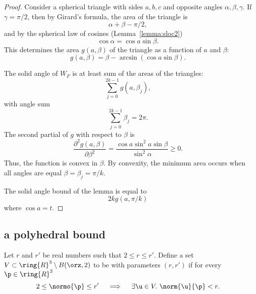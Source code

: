 \begin{proof}
Consider a spherical triangle with sides $a,b,c$ and opposite angles
$\alpha,\beta,\gamma$.  If $\gamma=\pi/2$, then by Girard's formula,
the area of the triangle is
\[  
\alpha+\beta-\pi/2,
\] 
and by the spherical law of cosines (Lemma~\ref{lemma:sloc2})
\[  
\cos\alpha =\cos a\sin\beta.
\] 
This determines the area $g(a,\beta)$ of the triangle 
as a function of $a$ and $\beta$:
\[
g(a,\beta) = \beta - \arcsin(\cos a \sin \beta).
\]
%
%
%
%
%
%
%
%

The solid angle of $W_F$ is at least sum of the areas of the triangles:
\[  
\sum_{j=0}^{2k-1} g(a,\beta_j),
\] 
with angle sum
\[  
\sum_{j=0}^{2k-1} \beta_j = 2\pi.
\] 
The second partial of $g$ with respect to $\beta$ is
\[  
\frac{\partial^2 g(a,\beta)}{\partial \beta^2} = 
\frac{\cos a\sin^2 a\sin \beta}{\sin^2\alpha} \ge 0.
\] 
Thus, the function is convex in $\beta$.  By convexity, the minimum area
occurs when all angles are equal $\beta=\beta_j = \pi/k$.

The solid angle bound of the lemma is equal to 
\[  
2 k g(a,\pi/k)
\] 
where $\cos a=t$.  
\end{proof}




\subsection{a polyhedral bound}

\begin{definition} 
\label{def:weakly-saturated}
Let $r$ and $r'$ be real numbers such that $2\le r\le r'$.  Define a
set $ V\subset\ring{R}^3\setminus B(\orz,2)$ to be  with parameters $(r,r')$ if for every $\p\in\ring{R}^3$
\[  
2\le\normo{\p}\le r'~~~\implies~~~ \exists \u\in V.~\norm{ \u}{\p}< r.
\] 
\end{definition}

